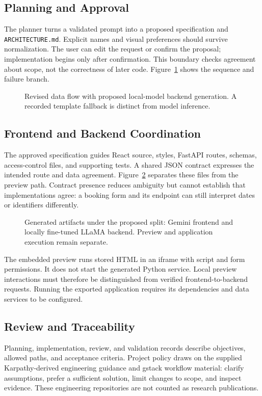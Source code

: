 \documentclass[conference,a4paper]{IEEEtran}
\begin{document}
\subsection{Planning and Approval}
The planner turns a validated prompt into a proposed specification and \texttt{ARCHITECTURE.md}. Explicit names and visual preferences should survive normalization. The user can edit the request or confirm the proposal; implementation begins only after confirmation. This boundary checks agreement about scope, not the correctness of later code. Figure~\ref{fig:flow} shows the sequence and failure branch.

\begin{figure}[!ht]
\centering

\caption{Revised data flow with proposed local-model backend generation. A recorded template fallback is distinct from model inference.}
\label{fig:flow}
\end{figure}

\subsection{Frontend and Backend Coordination}
The approved specification guides React source, styles, FastAPI routes, schemas, access-control files, and supporting tests. A shared JSON contract expresses the intended route and data agreement. Figure~\ref{fig:structure} separates these files from the preview path. Contract presence reduces ambiguity but cannot establish that implementations agree: a booking form and its endpoint can still interpret dates or identifiers differently.

\begin{figure}[!ht]
\centering

\caption{Generated artifacts under the proposed split: Gemini frontend and locally fine-tuned LLaMA backend. Preview and application execution remain separate.}
\label{fig:structure}
\end{figure}

The embedded preview runs stored HTML in an iframe with script and form permissions. It does not start the generated Python service. Local preview interactions must therefore be distinguished from verified frontend-to-backend requests. Running the exported application requires its dependencies and data services to be configured.

\subsection{Review and Traceability}
Planning, implementation, review, and validation records describe objectives, allowed paths, and acceptance criteria. Project policy draws on the supplied Karpathy-derived engineering guidance and gstack workflow material: clarify assumptions, prefer a sufficient solution, limit changes to scope, and inspect evidence. These engineering repositories are not counted as research publications.
\end{document}
